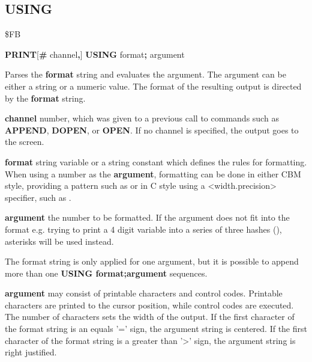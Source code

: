 \subsection{USING}
\begin{description}[leftmargin=2cm,style=nextline]
\item [Token:] \$FB
\item [Format:] {\bf PRINT}[{\bf\#} channel{\bf,}] {\bf USING} format{\bf;} argument
\item [Usage:]  Parses the {\bf format} string and evaluates the argument.
                The argument can be either a string or a numeric value.
                The format of the resulting output is directed
                by the {\bf format} string.

                {\bf channel} number, which was given to a previous
                call to commands such as {\bf APPEND}, {\bf DOPEN}, or {\bf OPEN}.
                If no channel is specified, the output goes to the screen.

                {\bf format} string variable or a string constant
                which defines the rules for formatting.
                When using a number as the {\bf argument}, formatting can be done in either
                CBM style, providing a pattern such as  
                or in C style using a <width.precision> specifier, such as .

                {\bf argument} the number to be formatted. If the argument does not fit into the format
                e.g. trying to print a 4 digit variable into a series of three
                hashes (\screentext{\#\#\#}), asterisks will be used instead.

\item [Remarks:] The format string is only applied for one argument,
                 but it is possible to append more than one
                 {\bf USING format;argument} sequences.

                {\bf argument} may consist of printable
                characters and control codes. Printable characters
                are printed to the cursor position, while control
                codes are executed.
                The number of \screentext{\#} characters sets the width of the output.
                If the first character of the format string
                is an equals '=' sign, the argument string is centered.
                If the first character of the format string
                is a greater than '>' sign, the argument string is right justified.



\end{description}
